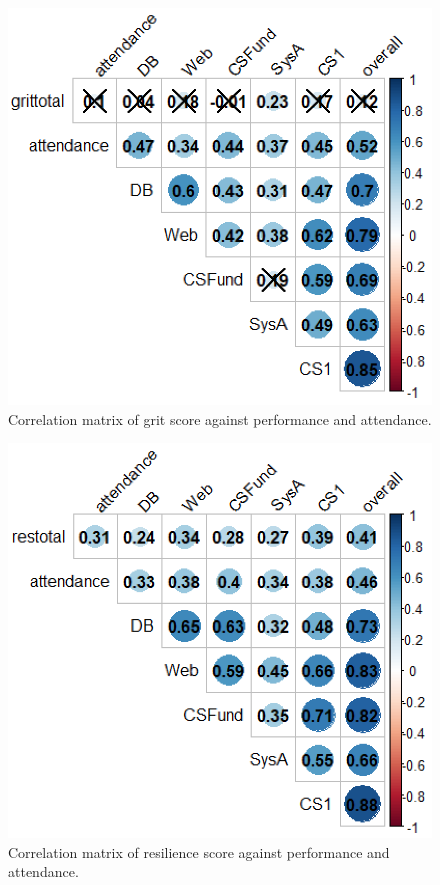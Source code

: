 \documentclass[sigconf]{acmart}
\begin{document}
\begin{figure}[h]
\centering
\includegraphics[width=.9\linewidth]{images/cor_plot_grit.png}
\caption{Correlation matrix of grit score against performance and attendance.}
\label{fig:cor_grit} 
\end{figure}

\begin{figure}[h]
\centering
\includegraphics[width=.9\linewidth]{images/cor_plot_res.png}
\caption{Correlation matrix of resilience score against performance and attendance.}
\label{fig:cor_res} 
\end{figure}
\end{document}
